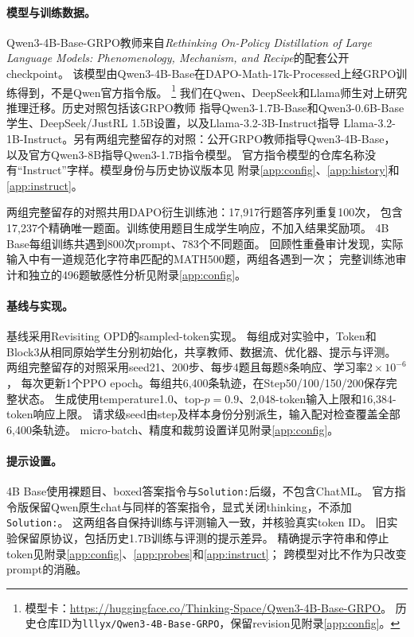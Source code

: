 \paragraph{模型与训练数据。}
Qwen3-4B-Base-GRPO教师来自\emph{Rethinking On-Policy Distillation of Large Language Models: Phenomenology, Mechanism, and Recipe}\citep{rethinking}的配套公开checkpoint。
该模型由Qwen3-4B-Base在DAPO-Math-17k-Processed上经GRPO训练得到，不是Qwen官方指令版。
\footnote{模型卡：\url{https://huggingface.co/Thinking-Space/Qwen3-4B-Base-GRPO}。
历史仓库ID为\texttt{lllyx/Qwen3-4B-Base-GRPO}，保留revision见附录\ref{app:config}。}
我们在Qwen、DeepSeek和Llama师生对上研究推理迁移。历史对照包括该GRPO教师
指导Qwen3-1.7B-Base和Qwen3-0.6B-Base学生、DeepSeek/JustRL 1.5B设置，以及Llama-3.2-3B-Instruct指导
Llama-3.2-1B-Instruct。另有两组完整留存的对照：公开GRPO教师指导Qwen3-4B-Base，
以及官方Qwen3-8B指导Qwen3-1.7B指令模型\citep{qwen3,llama3,llama32}。
官方指令模型的仓库名称没有“Instruct”字样。模型身份与历史协议版本见
附录\ref{app:config}、\ref{app:history}和\ref{app:instruct}。

两组完整留存的对照共用DAPO衍生训练池\citep{dapo}：17,917行题答序列重复100次，
包含17,237个精确唯一题面。训练使用题目生成学生响应，不加入结果奖励项。
4B Base每组训练共遇到800次prompt、783个不同题面。
回顾性重叠审计发现，实际输入中有一道规范化字符串匹配的MATH500题，两组各遇到一次；
完整训练池审计和独立的496题敏感性分析见附录\ref{app:config}。

\paragraph{基线与实现。}
基线采用Revisiting OPD的sampled-token实现\citep{revisiting}。
每组成对实验中，Token和Block3从相同原始学生分别初始化，共享教师、数据流、优化器、提示与评测。
两组完整留存的对照采用seed21、200步、每步4题且每题8条响应、学习率$2\times10^{-6}$，
每次更新1个PPO epoch。每组共6,400条轨迹，在Step50/100/150/200保存完整状态。
生成使用temperature1.0、top-$p=0.9$、2,048-token输入上限和16,384-token响应上限。
请求级seed由step及样本身份分别派生，输入配对检查覆盖全部6,400条轨迹。
micro-batch、精度和裁剪设置详见附录\ref{app:config}。

\paragraph{提示设置。}
4B Base使用裸题目、boxed答案指令与\texttt{Solution:}后缀，不包含ChatML。
官方指令版保留Qwen原生chat与同样的答案指令，显式关闭thinking，不添加\texttt{Solution:}。
这两组各自保持训练与评测输入一致，并核验真实token ID。
旧实验保留原协议，包括历史1.7B训练与评测的提示差异。
精确提示字符串和停止token见附录\ref{app:config}、\ref{app:probes}和\ref{app:instruct}；
跨模型对比不作为只改变prompt的消融。

